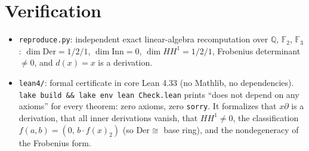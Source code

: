 \documentclass[11pt]{article}
\theoremstyle{definition}
\begin{document}
\section{Verification}

\begin{itemize}
\item \texttt{reproduce.py}: independent exact linear-algebra recomputation
  over $\mathbb{Q}$, $\mathbb{F}_2$, $\mathbb{F}_3$:
  $\dim\mathrm{Der}=1/2/1$, $\dim\mathrm{Inn}=0$, $\dim HH^1=1/2/1$,
  Frobenius determinant $\neq 0$, and $d(x)=x$ is a derivation.
\item \texttt{lean4/}: formal certificate in core Lean 4.33 (no Mathlib, no
  dependencies). \texttt{lake build \&\& lake env lean Check.lean} prints
  ``does not depend on any axioms'' for every theorem: zero axioms, zero
  \texttt{sorry}. It formalizes that $x\partial$ is a derivation, that all
  inner derivations vanish, that $HH^1\neq 0$, the classification
  $f(a,b)=(0,\,b\cdot f(x)_2)$ (so $\mathrm{Der}\cong$ base ring), and the
  nondegeneracy of the Frobenius form.
\end{itemize}
\end{document}
